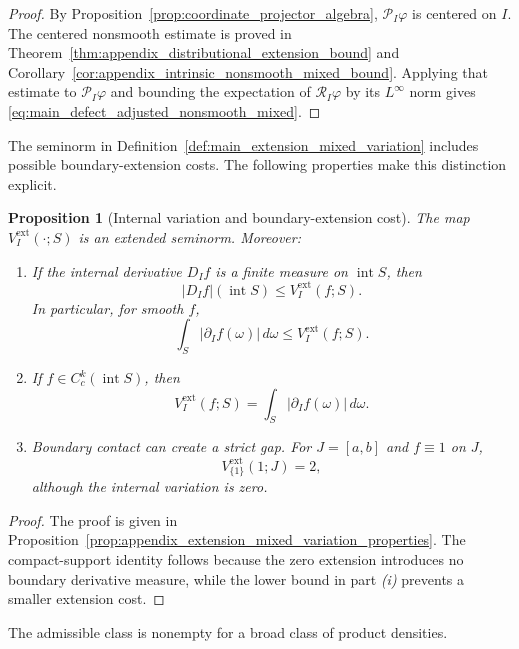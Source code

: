 \documentclass[11pt,letterpaper]{article}
\newtheorem{proposition}[theorem]{Proposition}
\theoremstyle{definition}
\theoremstyle{remark}
\begin{document}
\begin{proof}
By Proposition~\ref{prop:coordinate_projector_algebra},
$\mathcal P_I\varphi$ is centered on $I$. The centered nonsmooth estimate is
proved in
Theorem~\ref{thm:appendix_distributional_extension_bound} and
Corollary~\ref{cor:appendix_intrinsic_nonsmooth_mixed_bound}. Applying that
estimate to $\mathcal P_I\varphi$ and bounding the expectation of
$\mathcal R_I\varphi$ by its $L^\infty$ norm gives
\eqref{eq:main_defect_adjusted_nonsmooth_mixed}.
\end{proof}

The seminorm in Definition~\ref{def:main_extension_mixed_variation} includes
possible boundary-extension costs. The following properties make this
distinction explicit.

\begin{proposition}[Internal variation and boundary-extension cost]
\label{prop:main_extension_variation_properties}
The map $V_I^{\mathrm{ext}}(\cdot;S)$ is an extended seminorm. Moreover:

\begin{enumerate}
\item[\emph{(i)}] If the internal derivative $D_If$ is a finite measure on
$\operatorname{int}S$, then
$$
|D_If|(\operatorname{int}S)
\le
V_I^{\mathrm{ext}}(f;S).
$$
In particular, for smooth $f$,
$$
\int_S|\partial_If(\omega)|\,d\omega
\le
V_I^{\mathrm{ext}}(f;S).
$$

\item[\emph{(ii)}] If $f\in C_c^k(\operatorname{int}S)$, then
$$
V_I^{\mathrm{ext}}(f;S)
=
\int_S|\partial_If(\omega)|\,d\omega.
$$

\item[\emph{(iii)}] Boundary contact can create a strict gap. For
$J=[a,b]$ and $f\equiv1$ on $J$,
$$
V_{\{1\}}^{\mathrm{ext}}(1;J)=2,
$$
although the internal variation is zero.
\end{enumerate}
\end{proposition}

\begin{proof}
The proof is given in
Proposition~\ref{prop:appendix_extension_mixed_variation_properties}. The
compact-support identity follows because the zero extension introduces no
boundary derivative measure, while the lower bound in part \emph{(i)} prevents
a smaller extension cost.
\end{proof}

The admissible class is nonempty for a broad class of product densities.
\end{document}
